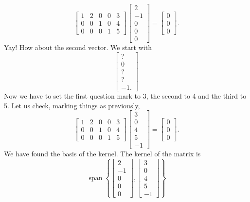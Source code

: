 \begin{example}
\begin{equation*}
\begin{bmatrix}
1 & \boxed{2} & 0 & 0 & 3 \\
0 & \boxed{0} & 1 & 0 & 4 \\
0 & \boxed{0} & 0 & 1 & 5
\end{bmatrix} 
\begin{bmatrix}
\boxed{2} \\ -1 \\ \boxed{0} \\ \boxed{0} \\ 0
\end{bmatrix}
=
\begin{bmatrix}
0 \\ 0 \\ 0
\end{bmatrix}
.
\end{equation*}
Yay!  How about the second vector.  We start with
\begin{equation*}
\begin{bmatrix}
? \\ 0 \\ ? \\ ? \\ -1 .
\end{bmatrix}
\end{equation*}
Now we have to set the first question mark to 3, the second to 4 and the
third to 5.  Let us check, marking things as previously,
\begin{equation*}
\begin{bmatrix}
1 & 2 & 0 & 0 & \boxed{3} \\
0 & 0 & 1 & 0 & \boxed{4} \\
0 & 0 & 0 & 1 & \boxed{5}
\end{bmatrix} 
\begin{bmatrix}
\boxed{3} \\ 0 \\ \boxed{4} \\ \boxed{5} \\ -1
\end{bmatrix}
=
\begin{bmatrix}
0 \\ 0 \\ 0
\end{bmatrix}
.
\end{equation*}
We have found the basis of the kernel.  The kernel of the matrix is
\begin{equation*}
\operatorname{span} \left\{
\begin{bmatrix}
2 \\ -1 \\ 0 \\ 0 \\ 0
\end{bmatrix}
,
\begin{bmatrix}
3 \\ 0 \\ 4 \\ 5 \\ -1
\end{bmatrix}
\right\}
\end{equation*}
\end{example}

